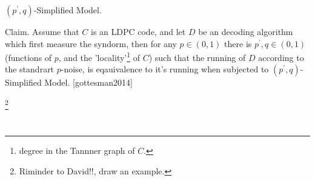 \documentclass{beamer}
\begin{document}
\begin{frame}{$(p^\prime, q)$-Simplified Model.}
  \begin{block}{Claim.}
    Assume that $C$ is an LDPC code, and let $D$ be an decoding algorithm which first measure the syndorm, then for any $p \in (0,1)$ there is $p^{\prime}, q \in (0,1)$ (functions of $p$, and the 'locality'\footnote{degree in the Tannner graph of $C$.} of $C$) such that the running of $D$ according to the standrart $p$-noise, is eqauivalence to it's running when subjected to $(p^{\prime}, q)$-Simplified Model. [gottesman2014]
  \end{block}
 \footnote{Riminder to David!!, draw an example.}
  
\end{frame}

\begin{frame}
  \begin{figure}[h]
    \begin{subfigure}[h]{0.4\textwidth}

    \label{alg:three}
    \end{subfigure}
    \begin{subfigure}[h]{0.1\textwidth}
      \
    \end{subfigure}
    \begin{subfigure}[h]{0.45\textwidth} 

    \label{fig:location}
    \end{subfigure} 
  \end{figure}

\end{frame}
\end{document}
